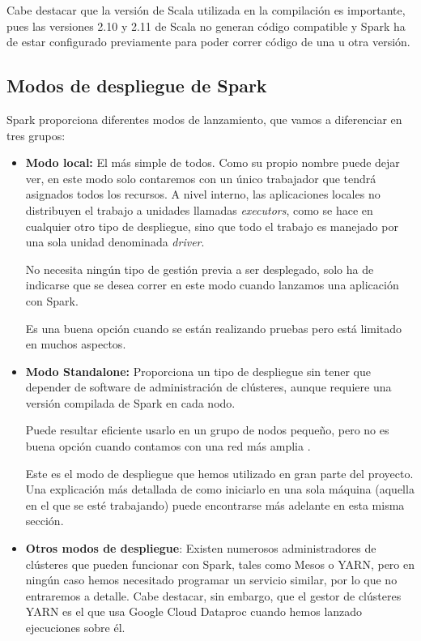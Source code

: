 Cabe destacar que la versión de Scala utilizada en la compilación es importante, pues las versiones 2.10 y 2.11 de Scala no generan código compatible y Spark ha de estar configurado previamente para poder correr código de una u otra versión.

\subsection{Modos de despliegue de Spark}\label{subsec:modosDespliegueSpark}

Spark proporciona diferentes modos de lanzamiento, que vamos a diferenciar en tres grupos:

\begin{itemize}
	\item \textbf{Modo local:} El más simple de todos. Como su propio nombre puede dejar ver, en este modo solo contaremos con un único trabajador que tendrá asignados todos los recursos. A nivel interno, las aplicaciones locales no distribuyen el trabajo a unidades llamadas \textit{executors}, como se hace en cualquier otro tipo de despliegue, sino que todo el trabajo es manejado por una sola unidad denominada \textit{driver}.
	
	No necesita ningún tipo de gestión previa a ser desplegado, solo ha de indicarse que se desea correr en este modo cuando lanzamos una aplicación con Spark.
	
	Es una buena opción cuando se están realizando pruebas pero está limitado en muchos aspectos.
	
	\item \textbf{Modo Standalone:} Proporciona un tipo de despliegue sin tener que depender de software de administración de clústeres, aunque requiere una versión compilada de Spark en cada nodo.
	
	Puede resultar eficiente usarlo en un grupo de nodos pequeño, pero no es buena opción cuando contamos con una red más amplia \cite{karau2015learning}.
	
	Este es el modo de despliegue que hemos utilizado en gran parte del proyecto. Una explicación más detallada de como iniciarlo en una sola máquina (aquella en el que se esté trabajando) puede encontrarse más adelante en esta misma sección.
	
	\item \textbf{Otros modos de despliegue}: Existen numerosos administradores de clústeres que pueden funcionar con Spark, tales como Mesos o YARN, pero en ningún caso hemos necesitado programar un servicio similar, por lo que no entraremos a detalle. Cabe destacar, sin embargo, que el gestor de clústeres YARN es el que usa Google Cloud Dataproc cuando hemos lanzado ejecuciones sobre él.
\end{itemize}

